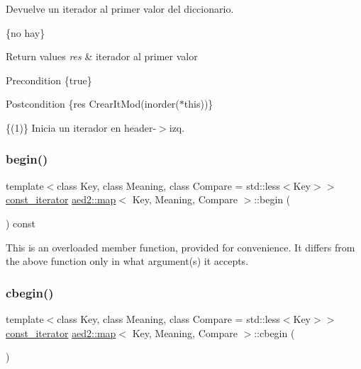 Devuelve un iterador al primer valor del diccionario. 

\{no hay\}


\begin{DoxyRetVals}{Return values}
{\em res} & iterador al primer valor\\
\hline
\end{DoxyRetVals}
\begin{DoxyPrecond}{Precondition}
\{true\} 
\end{DoxyPrecond}
\begin{DoxyPostcond}{Postcondition}
\{res  Crear\+It\+Mod(inorder($\ast$this))\}
\end{DoxyPostcond}
\{(1)\} Inicia un iterador en header-\/$>$izq. \mbox{\label{classaed2_1_1map_af3b1818c2b44e37221cc3b131768555b}} 
\subsubsection{\texorpdfstring{begin()}{begin()}\hspace{0.1cm}{\footnotesize\ttfamily [2/2]}}
{\footnotesize\ttfamily template$<$class Key, class Meaning, class Compare = std\+::less$<$\+Key$>$$>$ \\
\hyperlink{classaed2_1_1map_1_1const__iterator}{const\+\_\+iterator} \hyperlink{classaed2_1_1map}{aed2\+::map}$<$ Key, Meaning, Compare $>$\+::begin (\begin{DoxyParamCaption}{ }\end{DoxyParamCaption}) const\hspace{0.3cm}{\ttfamily [inline]}}

This is an overloaded member function, provided for convenience. It differs from the above function only in what argument(s) it accepts. \mbox{\label{classaed2_1_1map_ab96ad892caa28f193481a578f4956a2a}} 
\subsubsection{\texorpdfstring{cbegin()}{cbegin()}}
{\footnotesize\ttfamily template$<$class Key, class Meaning, class Compare = std\+::less$<$\+Key$>$$>$ \\
\hyperlink{classaed2_1_1map_1_1const__iterator}{const\+\_\+iterator} \hyperlink{classaed2_1_1map}{aed2\+::map}$<$ Key, Meaning, Compare $>$\+::cbegin (\begin{DoxyParamCaption}{ }\end{DoxyParamCaption})\hspace{0.3cm}{\ttfamily [inline]}}

